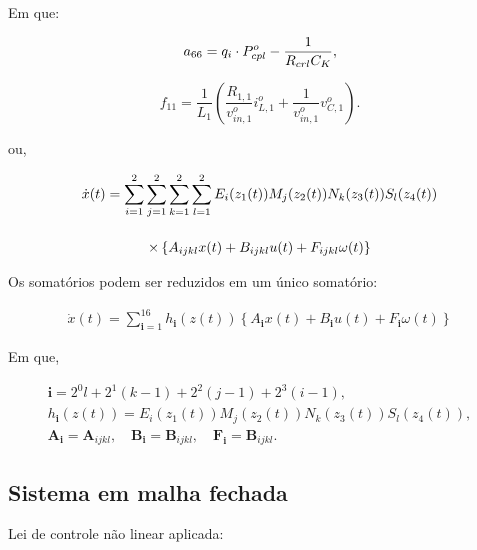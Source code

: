 Em que:

\begin{equation*}
    a_{66} = \displaystyle q_i \cdot P_{cpl}^o - \frac{1}{R_{crl} C_K},
\end{equation*} 

\begin{equation*}
    f_{11} = \frac{1}{L_1} \left( \frac{R_{1,1}}{v_{in,1}^o}i_{L,1}^o + \frac{1}{v_{in,1}^o}v_{C,1}^o \right).
\end{equation*}

ou, 

\begin{gather}
    \dot{x}(t) =
  \sum\limits_{i=1}^{2} \sum\limits_{j=1}^{2} \sum\limits_{k=1}^{2} \sum\limits_{l=1}^{2} E_i(z_1(t))M_j(z_2(t))N_k(z_3(t))S_l(z_4(t))
  \notag \\[12pt] \times
  \left\{
    A_{ijkl}x(t) + B_{ijkl}u(t) + F_{ijkl}\omega(t)
  \right\}
\end{gather}

Os somatórios podem ser reduzidos em um único somatório:

\begin{gather}
    \dot{x}(t) =
  \sum\limits_{\mathbf{i}=1}^{16} h_{\mathbf{i}}(z(t))\left\{ A_{\mathbf{i}}x(t) + B_{\mathbf{i}}u(t) + F_{\mathbf{i}}\omega(t)\right\}
\end{gather}

Em que,


\begin{gather*}
    \mathbf{i}=2^0l+2^1(k-1)+2^2(j-1)+2^3(i-1), \\
    h_\mathbf{i}(z(t))=E_i\left(z_1(t)\right) M_j\left(z_2(t)\right) N_k\left(z_3(t)\right) S_l\left(z_4(t)\right), \\
    \boldsymbol{A}_\mathbf{i}=\boldsymbol{A}_{i j k l}, \quad \boldsymbol{B}_\mathbf{i}=\boldsymbol{B}_{i j k l}, \quad \boldsymbol{F}_\mathbf{i}=\boldsymbol{B}_{i j k l} .
\end{gather*}

\subsection*{Sistema em malha fechada}
Lei de controle não linear aplicada:

